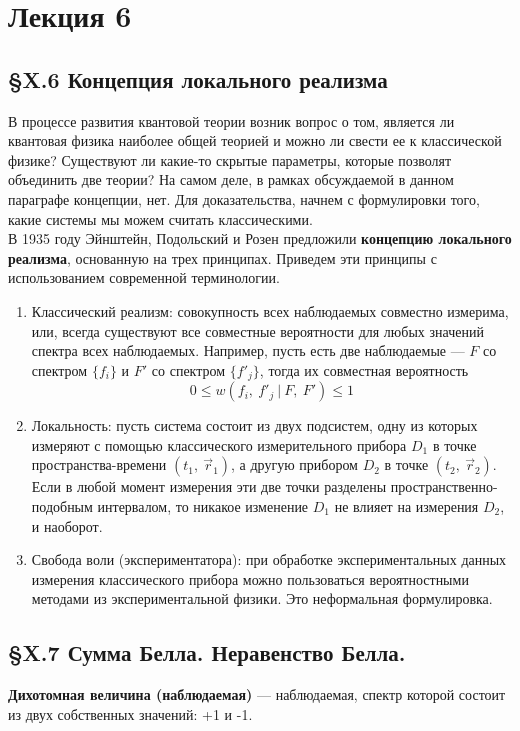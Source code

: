\section{Лекция 6}
\subsection{\S X.6 Концепция локального реализма}
В процессе развития квантовой теории возник вопрос о том, является ли квантовая физика наиболее общей теорией и можно ли свести ее к классической физике? Существуют ли какие-то скрытые параметры, которые позволят объединить две теории? На самом деле, в рамках обсуждаемой в данном параграфе концепции, нет. Для доказательства, начнем с формулировки того, какие системы мы можем считать классическими.\\

В 1935 году Эйнштейн, Подольский и Розен предложили \textbf{концепцию локального реализма}, основанную на трех принципах. Приведем эти принципы с использованием современной терминологии.
\begin{enumerate}
	\item Классический реализм: совокупность всех наблюдаемых совместно измерима, или, всегда существуют все совместные вероятности для любых значений спектра всех наблюдаемых. Например, пусть есть две наблюдаемые --- $F$ со спектром $\{f_i\}$ и $F'$ со спектром $\{f'_j\}$, тогда их совместная вероятность
	\[
	0 \leq w(f_i,~ f'_j~|~F,~F')\leq 1
	\]
	\item Локальность: пусть система состоит из двух подсистем, одну из которых измеряют с помощью классического измерительного прибора $D_1$ в точке пространства-времени $(t_1,~\vec{r}_1)$, а другую прибором $D_2$ в точке $(t_2,~\vec{r}_2)$. Если в любой момент измерения эти две точки разделены пространственно-подобным интервалом, то никакое изменение $D_1$ не влияет на измерения $D_2$, и наоборот.
	\item Свобода воли (экспериментатора): при обработке экспериментальных данных измерения классического прибора можно пользоваться вероятностными методами из экспериментальной физики. Это неформальная формулировка.
\end{enumerate}



\subsection{\S X.7 Сумма Белла. Неравенство Белла.}
\begin{definition}
	\textbf{Дихотомная величина (наблюдаемая)} --- наблюдаемая, спектр которой состоит из двух собственных значений: +1 и -1.
\end{definition}

